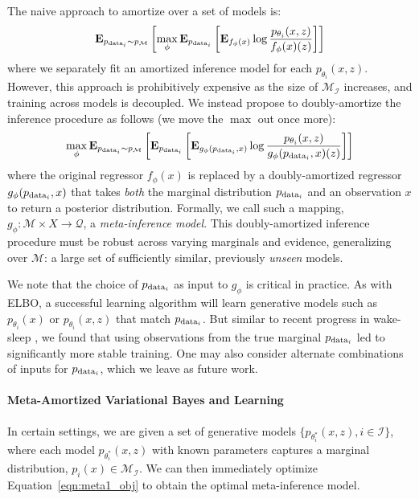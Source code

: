 The naive approach to amortize over a set of models is:
\begin{equation}
\mathbf{E}_{p_{\textup{data}_i} \sim p_{\mathcal{M}}} \left[
\max_{\phi}\mathbf{E}_{p_{\textup{data}_i}} \left[ \mathbf{E}_{f_\phi(x)} \log \frac{p_{\theta_i}(x,z)}{f_\phi(x)(z)} \right] \right]
\end{equation}
where we separately fit an amortized inference model for each $p_{\theta_i}(x,z)$. However, this approach is prohibitively expensive as the size of $\mathcal{M}_{\mathcal{I}}$ increases, and training across models is decoupled.
We instead propose to doubly-amortize the inference procedure as follows (we move the $\max$ out once more):
\begin{equation}
\max_{\phi} \mathbf{E}_{p_{\textup{data}_i} \sim p_{\mathcal{M}}} \left[
\mathbf{E}_{p_{\textup{data}_i}} \left[ \mathbf{E}_{g_\phi(p_{\textup{data}_i}, x)} \log \frac{p_{\theta_i}(x,z)}{g_\phi(p_{\textup{data}_i},x)(z)} \right] \right] 
\label{eqn:meta1_obj}
\end{equation}
where the original regressor $f_\phi(x)$ is replaced by a doubly-amortized regressor $g_\phi(p_{\textup{data}_i},x)$ that takes \textit{both} the marginal distribution $p_{\textup{data}_i}$ and an observation $x$ to return a posterior distribution. Formally, we call such a mapping, $g_\phi: \mathcal{M} \times X \rightarrow \mathcal{Q}$, a \textit{meta-inference model}. This doubly-amortized inference procedure must be robust across varying marginals and evidence, generalizing over $\mathcal{M}$: a large set of sufficiently similar, previously \textit{unseen} models. 

We note that the choice of $p_{\textup{data}_i}$ as input to $g_\phi$ is critical in practice. As with ELBO, a successful learning algorithm will learn generative models such as $p_{\theta_i}(x)$ or $p_{\theta_i}(x, z)$ that match $p_{\textup{data}_i}$.
But similar to recent progress in wake-sleep \cite{hinton1995wake,bornschein2014reweighted,le2018revisiting}, we found that using observations from the true marginal $p_{\textup{data}_i}$ led to significantly more stable training.
One may also consider alternate combinations of inputs for $p_{\textup{data}_i}$, which we leave as future work.

\paragraph{Meta-Amortized Variational Bayes and Learning}
In certain settings, we are given a set of generative models $\{p_{\theta_i^*}(x, z), i \in \mathcal{I} \}$, where each model $p_{\theta_i^*}(x, z)$ with known parameters  captures a marginal distribution, $p_i(x) \in \mathcal{M}_{\mathcal{I}}$. 
We can then immediately optimize Equation~\ref{eqn:meta1_obj} to obtain the optimal meta-inference model. 

